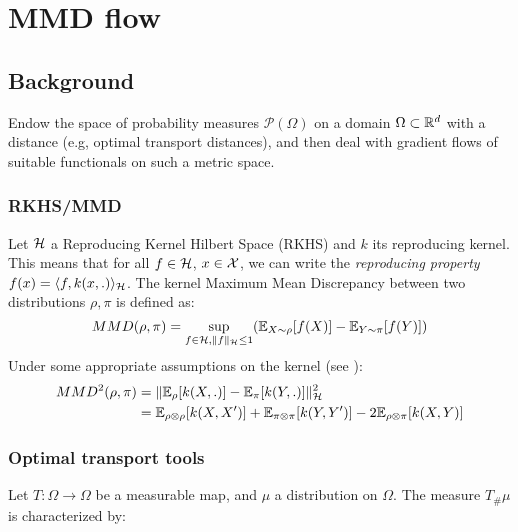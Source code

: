 \section{MMD flow}


\subsection{Background}

Endow the space of probability measures $\mathcal{P}(\Omega)$ on a domain $\Omega \subset {{\mathbb R}}^d$ with a distance (e.g, optimal transport distances), and then deal with gradient flows of suitable functionals on such a metric space.


\subsubsection{RKHS/MMD}


Let ${{\mathcal H}}$ a Reproducing Kernel Hilbert Space (RKHS) and $k$ its reproducing kernel. This means that for all $f \in {{\mathcal H}}$, $x \in {{\mathcal X}}$, we can write the \textit{reproducing property} $f(x)=\langle f, k(x,.) \rangle_{{{\mathcal H}}}$. The kernel Maximum Mean Discrepancy between two distributions $\rho,\pi$ is defined as:
\begin{equation}
MMD(\rho,\pi)=\sup_{f \in {{\mathcal H}},  \|f\|_{{{\mathcal H}}}\le 1} ({{\mathbb E}}_{X \sim \rho}[f(X)]-{{\mathbb E}}_{Y \sim \pi}[f(Y)])
\end{equation}
Under some appropriate assumptions on the kernel (see \cite{gretton2012kernel}):
\begin{align}
MMD^2(\rho,\pi)&=\|{{\mathbb E}}_{\rho}[k(X,.)] - {{\mathbb E}}_{\pi}[k(Y,.)]\|^2_{{{\mathcal H}}}\\
&={{\mathbb E}}_{\rho \otimes \rho}[k(X,X')]+{{\mathbb E}}_{\pi \otimes \pi}[k(Y,Y')] - 2{{\mathbb E}}_{\rho \otimes \pi}[k(X,Y)]
\end{align}


\subsubsection{Optimal transport tools}

Let $T: \Omega \rightarrow \Omega$ be a measurable map, and $\mu$ a distribution on $\Omega$. The measure $T_{\#}\mu$
is characterized by:



